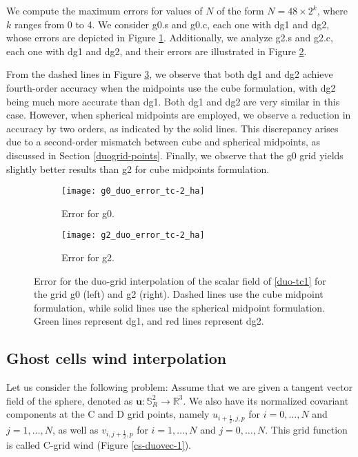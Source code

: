 We compute the maximum errors for values of $N$ of the form $N=48\times2^k$, where $k$ ranges from 0 to 4. 
We consider g0.s and g0.c, each one with dg1 and dg2, whose errors are depicted in Figure \ref{cs-duoscalar-tc1-g0}.
Additionally, we analyze g2.s and g2.c, each one with dg1 and dg2, and their errors are illustrated in Figure \ref{cs-duoscalar-tc1-g2}.

From the dashed lines in Figure \ref{cs-tc1-error}, we observe that both dg1 and dg2 achieve fourth-order accuracy when the midpoints use the cube formulation, 
with dg2 being much more accurate than dg1.
Both dg1 and dg2 are very similar in this case.
However, when spherical midpoints are employed, we observe a reduction in accuracy by two orders, as indicated by the solid lines.
This discrepancy arises due to a second-order mismatch between cube and spherical midpoints, as discussed in Section \ref{duogrid-points}.
Finally, we observe that the g0 grid yields slightly better results than g2 for cube midpoints formulation.
\begin{figure}[!htb]
	\centering
	\begin{subfigure}{0.45\textwidth}
		\centering
		\texttt{[image: g0\_duo\_error\_tc-2\_ha]}
		\caption{Error for g0.\label{cs-duoscalar-tc1-g0}}
	\end{subfigure}
	\begin{subfigure}{0.45\textwidth}
		\centering
		\texttt{[image: g2\_duo\_error\_tc-2\_ha]}
		\caption{Error for g2.\label{cs-duoscalar-tc1-g2}}
	\end{subfigure}
	\caption{Error for the duo-grid interpolation of the scalar field of \eqref{duo-tc1} for the grid g0 (left) and g2 (right).
Dashed lines use the cube midpoint formulation, while solid lines use the spherical midpoint formulation.
Green lines represent dg1, and red lines represent dg2.\label{cs-tc1-error}}
\end{figure}


\subsection{Ghost cells wind interpolation}
\label{cs-wind-interp}
Let us consider the following problem: Assume that we are given a tangent vector field of the sphere, denoted as 
$\boldsymbol{u}:\mathbb{S}^2_R \to \mathbb{R}^3$. We also have its normalized covariant components at the C and D grid points, namely $u_{i+\frac{1}{2},j,p}$ for $i=0, \ldots, N$ and $j=1, \ldots, N$, as well as
$v_{i,j+\frac{1}{2},p}$ for $i=1, \ldots, N$ and $j=0, \ldots, N$. This grid function is called C-grid wind (Figure \ref{cs-duovec-1}).

